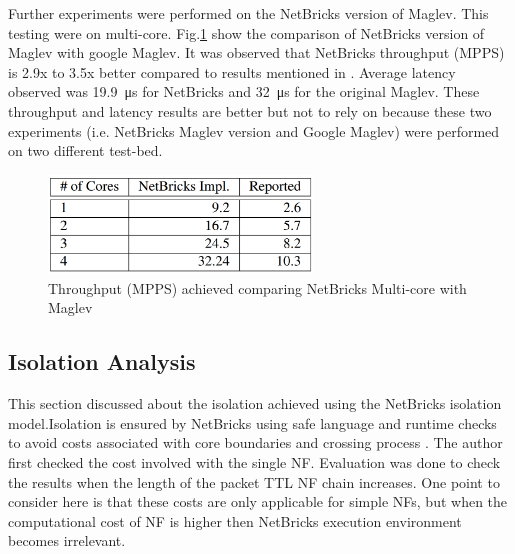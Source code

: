 \documentclass[10pt, a4paper, conference]{IEEEtran}
\begin{document}
Further experiments were performed on the NetBricks version of Maglev. This testing were on multi-core\cite{Panda2016}. Fig.\ref{key7} show the comparison of NetBricks version of Maglev with google Maglev. It was observed that NetBricks throughput (MPPS) is  2.9x to 3.5x better compared to results mentioned in \cite{Yaghoubi2012}. Average latency observed was \SI{19.9}{\micro\second} for NetBricks and \SI{32}{\micro\second} for the original Maglev. These throughput and latency results are better but not to rely on because these two experiments (i.e. NetBricks Maglev version and Google Maglev) were performed on two different test-bed\cite{Panda2016}.    
\begin{figure}
	\centering
	\includegraphics[width=70mm]{figures/tab2}
	\caption{Throughput (MPPS) achieved comparing NetBricks Multi-core with Maglev\cite{Panda2016}}
	
	\label{key7}
\end{figure}
\subsection{Isolation Analysis}
\label{isolation analysis}
This section discussed about the isolation achieved using the NetBricks isolation model.Isolation is ensured by NetBricks using safe language and runtime checks to avoid costs associated with core boundaries and crossing process \cite{Panda2016}. The author first checked the cost involved with the single NF. Evaluation was done to check the results when the length of the packet TTL NF chain increases. One point to consider here is that these costs are only applicable for simple NFs, but when the computational cost of NF is higher then NetBricks execution environment becomes irrelevant\cite{Panda2016}.
\end{document}

